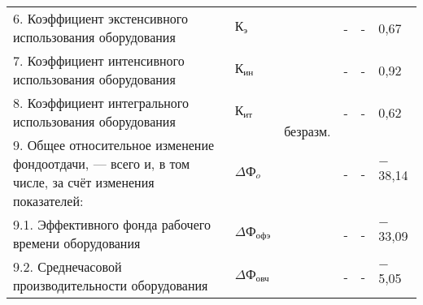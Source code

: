 \begin{table}[h!]
{\begin{tabular}{| p{} | p{} | p{} | p{} | p{} | p{} |}
      6. Коэффициент экстенсивного использования оборудования & $ \text{К}_{\text{э}} $ & \multirow{5}{*}{безразм.} & - & - & 0,67 \\ \cline{1-2}\cline{4-6}

      7. Коэффициент интенсивного использования оборудования & $ \text{К}_{\text{ин}} $ & & - & - & 0,92 \\ \cline{1-2}\cline{4-6}

      8. Коэффициент интегрального использования оборудования & $ \text{К}_{\text{ит}} $ & & - & - & 0,62 \\ \hline

      9. Общее относительное изменение фондоотдачи, --- всего и, в том числе, за счёт изменения показателей: & $ \Delta \text{Ф}_o $ & \multirow{6}{*}{\%} & - & - & $-$38,14 \\ \cline{1-2}\cline{4-6}

      9.1. Эффективного фонда рабочего времени оборудования & $ \Delta \text{Ф}_{\text{офэ}} $ & & - & - & $-$33,09 \\ \cline{1-2}\cline{4-6}

      9.2. Среднечасовой производительности оборудования & $ \Delta \text{Ф}_{\text{овч}} $ & & - & - & $-$5,05 \\ \hline
    \end{tabular}
  }
\end{table}

\newpage
